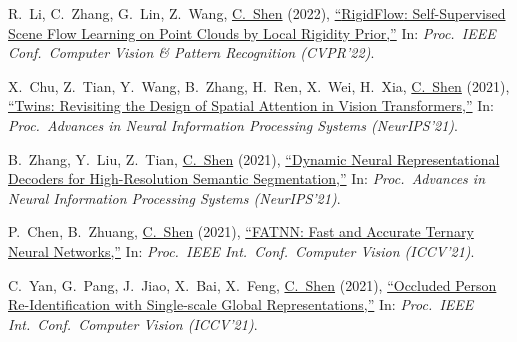 \documentclass[9pt, a4paper]{article}
\newcommand{\years}[1]{\marginnote{\scriptsize #1}}
\def\highlight{\uline}
\begin{document}
\medskip

\years{2022} R.~Li, C.~Zhang, G.~Lin, Z.~Wang, \highlight{C.~Shen} (2022),
\href{http://www.google.com/search?lr=&ie=UTF-8&oe=UTF-8&q=RigidFlow%3A+Self-Supervised+Scene+Flow+Learning+on+Point+Clouds+by+Local+Rigidity+Prior+Ruibo+Li%2C+Chi+Zhang%2C+Guosheng+Lin%2C+Zhe+Wang%2C+Chunhua+Shen}{``{RigidFlow}: Self-Supervised Scene Flow Learning on Point Clouds by Local Rigidity Prior,{}''}
In: \emph{Proc.\ IEEE Conf.\  Computer Vision \& Pattern Recognition (CVPR'22)}.

\medskip

\years{2021} X.~Chu, Z.~Tian, Y.~Wang, B.~Zhang, H.~Ren, X.~Wei, H.~Xia, \highlight{C.~Shen} (2021),
\href{http://www.google.com/search?lr=&ie=UTF-8&oe=UTF-8&q=Twins%3A+Revisiting+the+Design+of+Spatial+Attention+in+Vision+Transformers+Xiangxiang+Chu%2C+Zhi+Tian%2C+Yuqing+Wang%2C+Bo+Zhang%2C+Haibing+Ren%2C+Xiaolin+Wei%2C+Huaxia+Xia%2C+Chunhua+Shen}{``Twins: Revisiting the Design of Spatial Attention in Vision Transformers,{}''}
In: \emph{Proc.\ Advances in Neural Information Processing Systems (NeurIPS'21)}.

\medskip

\years{2021} B.~Zhang, Y.~Liu, Z.~Tian, \highlight{C.~Shen} (2021),
\href{http://www.google.com/search?lr=&ie=UTF-8&oe=UTF-8&q=Dynamic+Neural+Representational+Decoders+for+High-Resolution+Semantic+Segmentation+Bowen+Zhang%2C+Yifan+Liu%2C+Zhi+Tian%2C+Chunhua+Shen}{``Dynamic Neural Representational Decoders for High-Resolution Semantic Segmentation,{}''}
In: \emph{Proc.\ Advances in Neural Information Processing Systems (NeurIPS'21)}.

\medskip

\years{2021} P.~Chen, B.~Zhuang, \highlight{C.~Shen} (2021),
\href{http://www.google.com/search?lr=&ie=UTF-8&oe=UTF-8&q=FATNN%3A+Fast+and+Accurate+Ternary+Neural+Networks+Peng+Chen%2C+Bohan+Zhuang%2C+Chunhua+Shen}{``{FATNN}: Fast and Accurate Ternary Neural Networks,{}''}
In: \emph{Proc.\ IEEE Int.\ Conf.\  Computer Vision (ICCV'21)}.

\medskip

\years{2021} C.~Yan, G.~Pang, J.~Jiao, X.~Bai, X.~Feng, \highlight{C.~Shen} (2021),
\href{http://www.google.com/search?lr=&ie=UTF-8&oe=UTF-8&q=Occluded+Person+Re-Identification+with+Single-scale+Global+Representations+Cheng+Yan%2C+Guansong+Pang%2C+Jile+Jiao%2C+Xiao+Bai%2C+Xuetao+Feng%2C+Chunhua+Shen}{``Occluded Person Re-Identification with Single-scale Global Representations,{}''}
In: \emph{Proc.\ IEEE Int.\ Conf.\  Computer Vision (ICCV'21)}.
\end{document}
